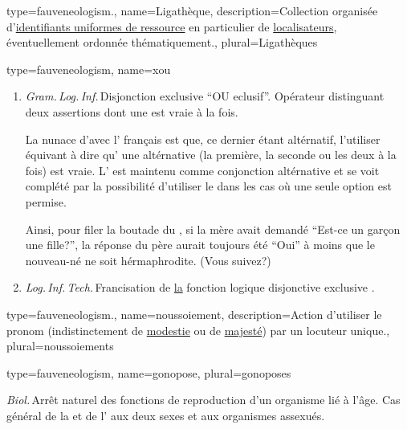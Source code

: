 {
{
  type=fauveneologism.,
    name={Ligathèque},
    description={Collection organisée d’\href{https://fr.wikipedia.org/wiki/Uniform\_Resource\_Identifier}{identifiants uniformes de ressource} en particulier de \href{https://fr.wikipedia.org/wiki/Uniform\_Resource\_Locator}{localisateurs}, éventuellement ordonnée thématiquement.},
    plural={Ligathèques}
}

{
  type=fauveneologism,
    name={xou}
}
{
  \begin{enumerate}
    \item \emph{Gram.\,Log.\,Inf.}\,Disjonction exclusive \enquote{OU eclusif}. Opérateur distinguant deux assertions dont une  est vraie à la fois.

    La nunace d’avec l’ français est que, ce dernier étant altérnatif, l’utiliser équivant à dire qu’ une altérnative (la première, la seconde ou les deux à la fois) est vraie. L’ est maintenu comme conjonction altérnative et se voit complété par la possibilité d’utiliser le  dans les cas où une seule option est permise.

    Ainsi, pour filer la boutade du \href{http://www.nojhan.net/geekscottes/index.php?id=144}{}, si la mère avait demandé \enquote{Est-ce un garçon  une fille?}, la réponse du père aurait toujours été \enquote{Oui} à moins que le nouveau-né ne soit hérmaphrodite. (Vous suivez?)


    \item \emph{Log.\,Inf.\,Tech.} Francisation de \href{https://fr.wikipedia.org/wiki/Xor}{la} fonction logique disjonctive exclusive .
  \end{enumerate}
}

{
  type=fauveneologism.,
    name={noussoiement},
    description={Action d’utiliser le pronom  (indistinctement de \href{https://fr.wiktionary.org/wiki/nous\_de\_modestie}{modestie} ou de \href{https://fr.wiktionary.org/wiki/nous\_de\_majesté}{majesté}) par un locuteur unique.},
    plural={noussoiements}
}

{
  type=fauveneologism,
    name={gonopose},
    plural={gonoposes}
}
{
  \emph{Biol.}\,Arrêt naturel des fonctions de reproduction d’un organisme lié à l’âge. Cas général de la  et de l’ aux deux sexes et aux organismes assexués.

}}
